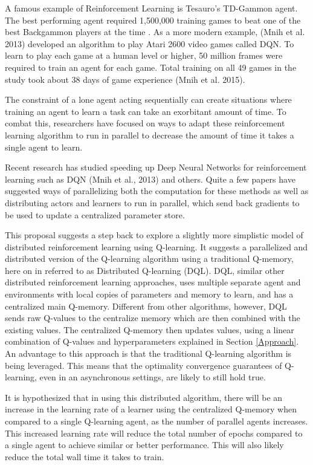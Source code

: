 \documentclass[jair,twoside,11pt,theapa]{article}
\begin{document}
A famous example of Reinforcement Learning is Tesauro's TD-Gammon agent.
The best performing agent required 1,500,000 training games to beat one of the best Backgammon players at the time \cite{Tesauro:1995:TDL:203330.203343}.
As a more modern example, (Mnih et al. 2013) developed an algorithm to play Atari 2600 video games called DQN. To learn to play each game at a human level or higher,
50 million frames were required to train an agent for each game. Total training on all 49 games in the study took about 38 days of game experience (Mnih et al. 2015). 

The constraint of a lone agent acting sequentially can create situations where training an agent to learn a task can take an exorbitant amount of time. 
To combat this, researchers have focused on ways to adapt these reinforcement learning algorithm to run in parallel to decrease the amount of time it takes a single agent to learn. 

Recent research has studied speeding up Deep Neural Networks for reinforcement learning such as DQN (Mnih et al., 2013) and others. Quite a few papers have suggested ways of parallelizing both the computation for these methods as well as distributing actors and learners to run in parallel, which send back gradients to be used to update a centralized parameter store. 

This proposal suggests a step back to explore a slightly more simplistic model of distributed reinforcement learning using Q-learning. It suggests a parallelized and distributed version of the Q-learning algorithm using a traditional Q-memory, here on in referred to as Distributed Q-learning (DQL). DQL, similar other distributed reinforcement learning approaches, uses multiple separate agent and environments with local copies of parameters and memory to learn, and has a centralized main Q-memory. Different from other algorithms, however, DQL sends raw Q-values to the centralize memory which are then combined with the existing values. The centralized Q-memory then updates values, using a linear combination of Q-values and hyperparameters explained in Section \ref{Approach}. An advantage to this approach is that the traditional Q-learning algorithm is being leveraged. This means that the optimality convergence guarantees of Q-learning, even in an asynchronous settings, are likely to still hold true.

It is hypothesized that in using this distributed algorithm, there will be an increase in the learning rate of a learner using the centralized Q-memory when compared to a single Q-learning agent, as the number of parallel agents increases. This increased learning rate will reduce the total number of epochs compared to a single agent to achieve similar or better performance. This will also likely reduce the total wall time it takes to train. 
\end{document}
